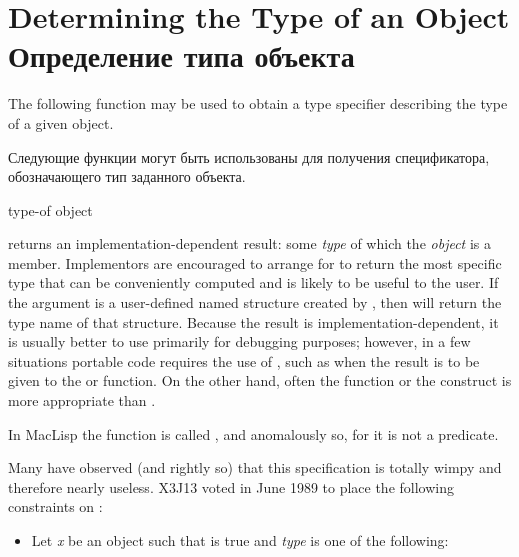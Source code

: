 \section{Determining the Type of an Object Определение типа объекта}

The following function may be used to obtain a type specifier
describing the type of a given object.

Следующие функции могут быть использованы для получения спецификатора,
обозначающего тип заданного объекта.

\begin{defun}[Function]
type-of object

\begin{obsolete}
\noindent
{} returns an implementation-dependent result:
some {\it type} of which the {\it object} is a member.  Implementors
are encouraged to arrange for
 to return the most specific type that can be
conveniently computed and is likely to be useful to the user.
If the argument is a user-defined named
structure created by , then  will return the type name
of that structure.
Because the result is implementation-dependent, it is usually better
to use  primarily for debugging purposes;
however, in a few situations portable code requires the use of
, such as when the result is to be given to the
 or  function.
On the other hand, often the  function
or the  construct
is more appropriate than .
\end{obsolete}

\beforenoterule
\begin{incompatibility}
In MacLisp the function  is called ,
and anomalously so, for it is not a predicate.
\end{incompatibility}
\afternoterule

\begin{new}
Many have observed (and rightly so) that this specification is totally wimpy
and therefore nearly useless.  X3J13 voted in June 1989
to place the following constraints on :


\begin{itemize}
\item
Let {\it x} be an object such that 
is true and {\it type} is one of the following:


\end{itemize}
\end{new}
\end{defun}
